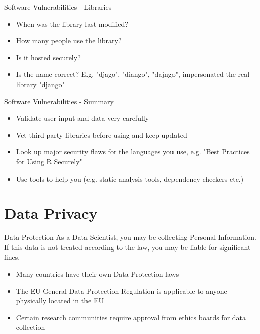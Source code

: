 \documentclass{beamer}
\begin{document}
\begin{frame}{Software Vulnerabilities - Libraries}
\begin{itemize}
\item When was the library last modified? 
\item How many people use the library? 
\item Is it hosted securely?
\item Is the name correct? E.g. "djago", "diango", "dajngo", impersonated the real library "django" 
\end{itemize}
\end{frame}

\begin{frame}{Software Vulnerabilities - Summary}
\begin{itemize}
\item Validate user input and data very carefully
\item Vet third party libraries before using and keep updated
\item Look up major security flaws for the languages you use, e.g. \href{https://www.r-consortium.org/blog/2015/08/17/best-practices-for-using-r-securely}{"Best Practices for Using R Securely"}
\item Use tools to help you (e.g. static analysis tools, dependency checkers etc.)
\end{itemize}
\end{frame}

\section{Data Privacy}
\frame{\sectionpage}

\begin{frame}{Data Protection}
As a Data Scientist, you may be collecting Personal Information. If this data is not treated according to the law, you may be liable for significant fines. 
\begin{itemize}
\item Many countries have their own Data Protection laws
\item The EU General Data Protection Regulation is applicable to anyone physically located in the EU
\item Certain research communities require approval from ethics boards for data collection
\end{itemize}
\end{frame}
\end{document}
